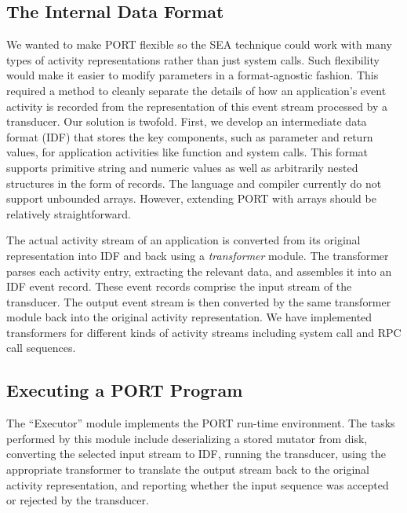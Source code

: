 \subsection{The Internal Data Format}

We wanted to make PORT flexible so the SEA technique
could
work with many types of
activity representations rather than just  system calls.
Such flexibility would make it easier to modify parameters in a format-agnostic fashion.
This required a method to cleanly separate the details of how
an application's event activity is recorded from the representation of this event stream
processed by a transducer.
Our solution is twofold.  First, we develop an intermediate data format
(IDF) that
stores the key components, such as parameter and return values,
for application activities like function
and system calls.  This format supports primitive string and numeric
values as well as arbitrarily nested structures in the form of records.
The language and compiler currently do not support unbounded arrays. However, extending PORT with arrays should be relatively straightforward.


The actual activity stream of an application is converted from its original representation into IDF and
back using a \emph{transformer} module. The transformer parses each activity entry,
extracting the relevant data, and assembles it into an IDF
event record.  These event records comprise the input stream of the transducer.
The output event stream is then converted by the same transformer module
back into the original activity representation. We have implemented transformers for different kinds of activity streams including system call and RPC call sequences.

\subsection{Executing a PORT Program}

The ``Executor'' module implements the PORT run-time environment.
The tasks performed by this module include deserializing a stored mutator from disk,
converting the selected input stream to IDF,
running the transducer,
using the appropriate transformer to translate the output stream back to the original activity representation, and reporting whether the input sequence was
accepted or rejected by the transducer.

